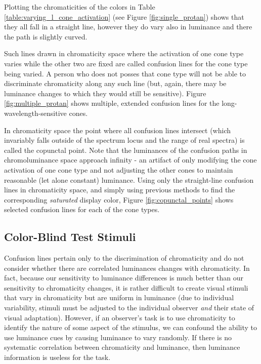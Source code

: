 \documentclass{article}
\begin{document}
\begin{multicols}{2}
Plotting the chromaticities of the colors in Table \ref{table:varying_l_cone_activation} (see Figure \ref{fig:single_protan}) shows that they all fall in a straight line, however they do vary also in luminance and there the path is slightly curved.

Such lines drawn in chromaticity space where the activation of one cone type varies while the other two are fixed are called confusion lines for the cone type being varied.  A person who does not posses that cone type will not be able to discriminate chromaticity along any such line (but, again, there may be luminance changes to which they would still be sensitive).  Figure \ref{fig:multiple_protan} shows multiple, extended confusion lines for the long-wavelength-sensitive cones.

In chromaticity space the point where all confusion lines intersect (which invariably falls outside of the spectrum locus and the range of real spectra) is called the copunctal point.  Note that the luminances of the confusion paths in chromoluminance space approach infinity - an artifact of only modifying the cone activation of one cone type and not adjusting the other cones to maintain reasonable (let alone constant) luminance.  Using only the straight-line confusion lines in chromaticity space, and simply using previous methods to find the corresponding \textit{saturated} display color, Figure \ref{fig:copunctal_points} shows selected confusion lines for each of the cone types.

\subsection{Color-Blind Test Stimuli} %

Confusion lines pertain only to the discrimination of chromaticity and do not consider whether there are correlated luminances changes with chromaticity.  In fact, because our sensitivity to luminance differences is much better than our sensitivity to chromaticity changes, it is rather difficult to create visual stimuli that vary in chromaticity but are uniform in luminance (due to individual variability, stimuli must be adjusted to the individual observer \textit{and} their state of visual adaptation).  However, if an observer's task is to use chromaticity to identify the nature of some aspect of the stimulus, we can confound the ability to use luminance cues by causing luminance to vary randomly.  If there is no systematic correlation between chromaticity and luminance, then luminance information is useless for the task.


\end{multicols}
\end{document}
